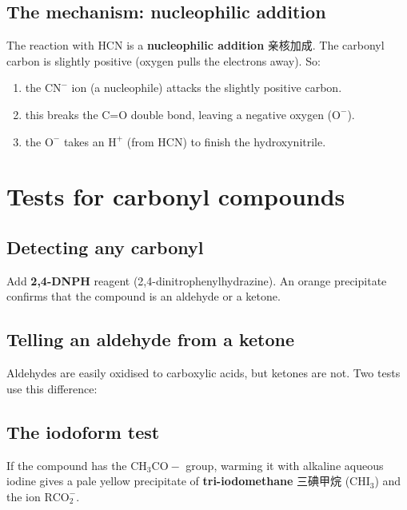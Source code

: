 \documentclass[11pt]{article}
\begin{document}
\subsection*{The mechanism: nucleophilic addition}

The reaction with $\text{HCN}$ is a \textbf{nucleophilic addition} 亲核加成. The carbonyl carbon is slightly positive (oxygen pulls the electrons away). So:

\begin{enumerate}
\item the $\text{CN}^-$ ion (a nucleophile) attacks the slightly positive carbon.

\item this breaks the C=O double bond, leaving a negative oxygen ($\text{O}^-$).

\item the $\text{O}^-$ takes an $\text{H}^+$ (from $\text{HCN}$) to finish the hydroxynitrile.

\end{enumerate}

\section*{Tests for carbonyl compounds}

\subsection*{Detecting any carbonyl}

Add \textbf{2,4-DNPH} reagent (2,4-dinitrophenylhydrazine). An orange precipitate confirms that the compound is an aldehyde or a ketone.

\subsection*{Telling an aldehyde from a ketone}

Aldehydes are easily oxidised to carboxylic acids, but ketones are not. Two tests use this difference:

\begin{center}
\end{center}

\subsection*{The iodoform test}

If the compound has the $\text{CH}_3\text{CO}-$ group, warming it with alkaline aqueous iodine gives a pale yellow precipitate of \textbf{tri-iodomethane} 三碘甲烷 ($\text{CHI}_3$) and the ion $\text{RCO}_2^-$.
\end{document}
